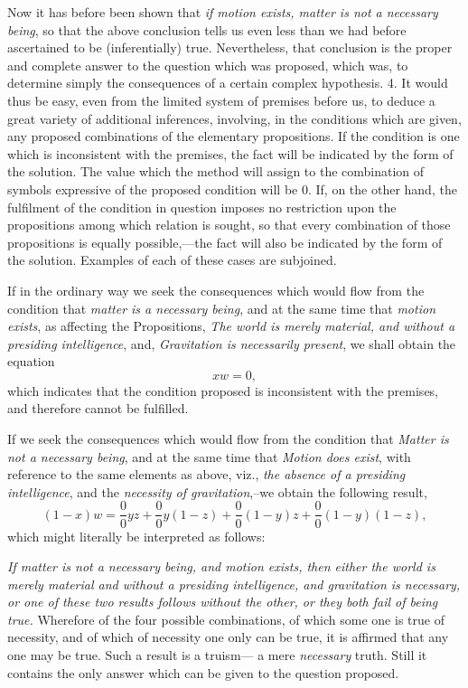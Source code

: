 \documentclass[oneside]{book}
\begin{document}
Now it has before been shown that \textit{if motion exists, matter is
not a necessary being}, so that the above conclusion tells us even
less than we had before ascertained to be (inferentially) true.
Nevertheless, that conclusion is the proper and complete answer
to the question which was proposed, which was, to determine
simply the consequences of a certain complex hypothesis.
4. It would thus be easy, even from the limited system of
premises before us, to deduce a great variety of additional inferences,
involving, in the conditions which are given, any proposed
combinations of the elementary propositions. If the condition
is one which is inconsistent with the premises, the fact
will be indicated by the form of the solution. The value which
the method will assign to the combination of symbols expressive
of the proposed condition will be 0. If, on the other hand, the
fulfilment of the condition in question imposes no restriction upon
the propositions among which relation is sought, so that every
combination of those propositions is equally possible,---the fact
will also be indicated by the form of the solution. Examples
of each of these cases are subjoined.

If in the ordinary way we seek the consequences which would
flow from the condition that \textit{matter is a necessary being}, and at
the same time that \textit{motion exists}, as affecting the Propositions,
\textit{The world is merely material, and without a presiding intelligence},
and, \textit{Gravitation is necessarily present}, we shall obtain the equation
\begin{equation*}
xw = 0,
\end{equation*}
which indicates that the condition proposed is inconsistent with
the premises, and therefore cannot be fulfilled.

If we seek the consequences which would flow from the condition
that \textit{Matter is not a necessary being}, and at the same time
that \textit{Motion does exist}, with reference to the same elements as
above, viz., \textit{the absence of a presiding intelligence}, and the \textit{necessity
of gravitation},--we obtain the following result,
\begin{equation*}
(1-x)w =\frac{0}{0}yz +\frac{0}{0}y(1-z) +\frac{0}{0}(1-y)z +\frac{0}{0}(1-y)(1-z),
\end{equation*}
which might literally be interpreted as follows:

\textit{If matter is not a necessary being, and motion exists, then
either the world is merely material and without a presiding intelligence,
and gravitation is necessary, or one of these two results follows
without the other, or they both fail of being true.} Wherefore
of the four possible combinations, of which some one is true of
necessity, and of which of necessity one only can be true, it is
affirmed that any one may be true. Such a result is a truism---
a mere \textit{necessary} truth. Still it contains the only answer which
can be given to the question proposed.
\end{document}
